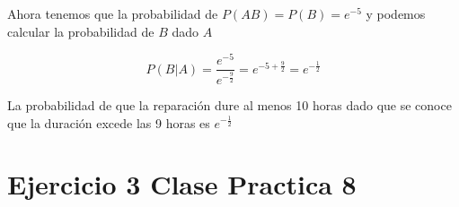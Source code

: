 \documentclass{article}
\begin{document}
\begin{flushleft}
        Ahora tenemos que la probabilidad de $P \left(AB\right) = P \left(B\right) = e^{-5}$
        y podemos calcular la probabilidad de $B$ dado $A$ 

        \begin{equation*}
            P \left(B|A\right) = \frac{e^{-5}}{e^{-\frac{9}{2}}} = e^{-5 + \frac{9}{2}}  = e^{-\frac{1}{2}}
        \end{equation*}

        La probabilidad de que la reparaci\'on dure al menos 10 horas dado que se conoce
        que la duraci\'on excede las 9 horas es $e^{-\frac{1}{2}}$

    \end{flushleft}
    
    \section*{Ejercicio 3 Clase Practica 8}
\end{document}
